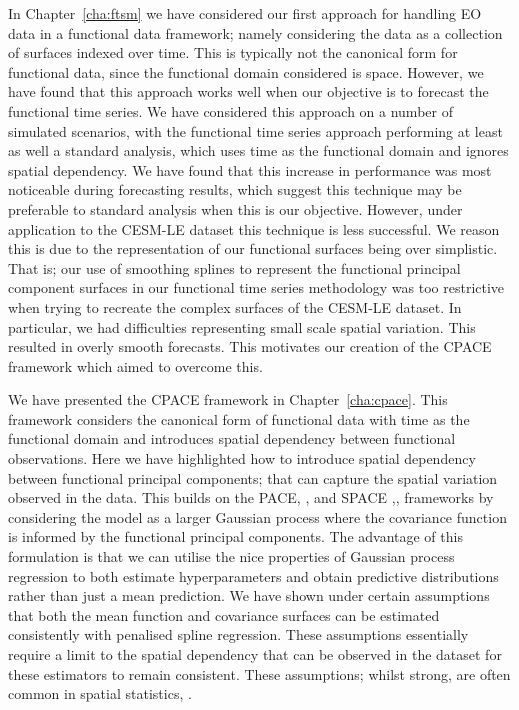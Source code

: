 In Chapter~\ref{cha:ftsm} we have considered our first approach for handling EO data in a functional data framework; namely considering the data as a collection of surfaces indexed over time.
This is typically not the canonical form for functional data, since the functional domain considered is space.
However, we have found that this approach works well when our objective is to forecast the functional time series.
We have considered this approach on a number of simulated scenarios, with the functional time series approach performing at least as well a standard analysis, which uses time as the functional domain and ignores spatial dependency.
We have found that this increase in performance was most noticeable during forecasting results, which suggest this technique may be preferable to standard analysis when this is our objective.
However, under application to the CESM-LE dataset this technique is less successful.
We reason this is due to the representation of our functional surfaces being over simplistic.
That is; our use of smoothing splines to represent the functional principal component surfaces in our functional time series methodology was too restrictive when trying to recreate the complex surfaces of the CESM-LE dataset.
In particular, we had difficulties representing small scale spatial variation.
This resulted in overly smooth forecasts.
This motivates our creation of the CPACE framework which aimed to overcome this.

We have presented the CPACE framework in Chapter~\ref{cha:cpace}. 
This framework considers the canonical form of functional data with time as the functional domain and introduces spatial dependency between functional observations.
Here we have highlighted how to introduce spatial dependency between functional principal components; that can capture the spatial variation observed in the data.
This builds on the PACE, \citep{yao_functional_2005}, and SPACE ,\citep{liu_functional_2017}, frameworks by considering the model as a larger Gaussian process where the covariance function is informed by the functional principal components.
The advantage of this formulation is that we can utilise the nice properties of Gaussian process regression to both estimate hyperparameters and obtain predictive distributions rather than just a mean prediction. 
We have shown under certain assumptions that both the mean function and covariance surfaces can be estimated consistently with penalised spline regression.
These assumptions essentially require a limit to the spatial dependency that can be observed in the dataset for these estimators to remain consistent.
These assumptions; whilst strong, are often common in spatial statistics, \citep{cressie_statistics_2015}.

